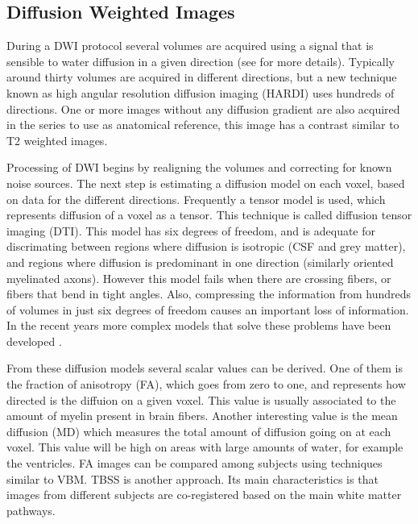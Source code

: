 
\subsection{Diffusion Weighted Images}


During a DWI protocol several volumes are acquired using a signal that is sensible to water diffusion in a given direction (see \autocite{jellison_diffusion_2004} for more details). Typically around thirty volumes are acquired in different directions, but a new technique known as high angular resolution diffusion imaging (HARDI) uses hundreds of directions. One or more images without any diffusion gradient are also acquired in the series to use as anatomical reference, this image has a contrast similar to T2 weighted images.

Processing of DWI begins by realigning the volumes and correcting for known noise sources. The next step is estimating a diffusion model on each voxel, based on data for the different directions. Frequently a tensor model is used, which represents diffusion of a voxel as a tensor. This technique is called diffusion tensor imaging (DTI). This model has six degrees of freedom, and is adequate for discrimating between regions where diffusion is isotropic (CSF and grey matter), and regions where diffusion is predominant in one direction (similarly oriented myelinated axons). However this model fails when there are crossing fibers, or fibers that bend in tight angles. Also, compressing the information from hundreds of volumes in just six degrees of freedom causes an important loss of information. In the recent years more complex models that solve these problems have been developed \autocite{tournier_diffusion_2011}.  

From these diffusion models several scalar values can be derived. One of them is the fraction of anisotropy (FA), which goes from zero to one, and represents how directed is the diffuion on a given voxel. This value is usually associated to the amount of myelin present in brain fibers. Another interesting value is the mean diffusion (MD) which measures the total amount of diffusion going on at each voxel. This value will be high on areas with large amounts of water, for example the ventricles. FA images can be compared among subjects using techniques similar to VBM. TBSS \autocite{smith_tract-based_2006} is another approach. Its main characteristics is that images from different subjects are co-registered based on the main white matter pathways. 

